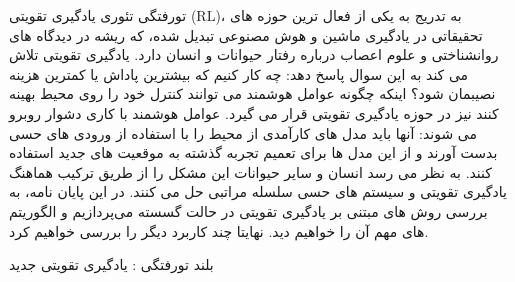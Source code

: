 


\pagestyle{empty}

‌تورفتگی
تئوری یادگیری تقویتی (RL)، به تدریج به یکی از فعال ترین حوزه های تحقیقاتی در یادگیری ماشین و هوش مصنوعی تبدیل شده، که ریشه در دیدگاه های روانشناختی و علوم اعصاب درباره رفتار حیوانات و انسان دارد. یادگیری تقویتی تلاش می کند به این سوال پاسخ دهد: چه کار کنیم که بیشترین پاداش یا کمترین هزینه نصیبمان شود؟ اینکه چگونه عوامل هوشمند می توانند کنترل خود را روی محیط بهینه کنند نیز در حوزه یادگیری تقویتی قرار می گیرد. عوامل هوشمند با کاری دشوار روبرو می شوند: آنها باید مدل های کارآمدی از محیط را با استفاده از ورودی های حسی بدست آورند و از این مدل ها برای تعمیم تجربه گذشته به موقعیت های جدید استفاده کنند. به نظر می رسد انسان و سایر حیوانات این مشکل را از طریق ترکیب هماهنگ یادگیری تقویتی و سیستم های حسی سلسله مراتبی حل می کنند. در این پایان نامه، به بررسی روش های مبتنی بر یادگیری تقویتی در حالت گسسته می‌پردازیم و الگوریتم های مهم آن را خواهیم دید. نهایتا چند کاربرد دیگر را بررسی خواهیم کرد.

‌بلند
‌تورفتگی : 
یادگیری تقویتی
‌جدید
